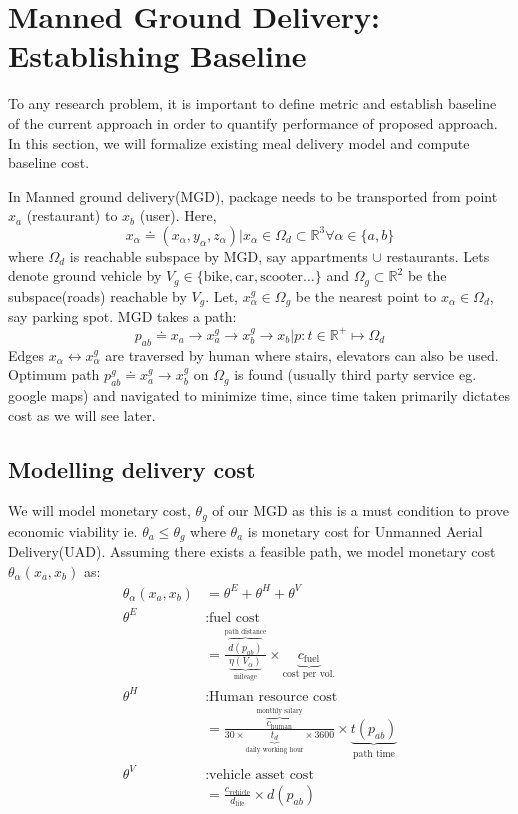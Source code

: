 \section{Manned Ground Delivery: Establishing Baseline}
\label{sec:mgd_model}
To any research problem, it is important to define metric and establish baseline of the current approach in order to quantify performance of proposed approach. In this section, we will formalize existing meal delivery model and compute baseline cost.

In Manned ground delivery(MGD), package needs to be transported from point $x_a$ (restaurant) to $x_b$ (user). Here, 
\begin{equation*}
    x_{\alpha} \doteq (x_\alpha, y_\alpha, z_\alpha) | x_\alpha \in \Omega_d \subset \mathbb{R}^3 \forall \alpha \in \{a,b\}
\end{equation*}
where $\Omega_d$ is reachable subspace by MGD, say appartments $\cup$ restaurants. Lets denote ground vehicle by $V_{g} \in \{\text{bike}, \text{car}, \text{scooter} \dots\}$ and $\Omega_g \subset \mathbb{R}^2$ be the subspace(roads) reachable by $V_{g}$. Let, $x_\alpha^g \in \Omega_g$ be the nearest point to $x_\alpha \in \Omega_d$, say parking spot. MGD takes a path:
\begin{equation*}
    p_{ab} \doteq x_a \longrightarrow x_a^g \longrightarrow x_b^g \longrightarrow x_b | p : t \in \mathbb{R}^+ \mapsto \Omega_d 
\end{equation*}
Edges $x_\alpha \longleftrightarrow x_\alpha^g$ are traversed by human where stairs, elevators can also be used. Optimum path $ p_{ab}^g \doteq x_a^g \longrightarrow x_b^g$ on $\Omega_g$ is found (usually third party service eg. google maps) and navigated to minimize time, since time taken primarily dictates cost as we will see later.

\subsection{Modelling delivery cost}
We will model monetary cost, $\theta_g$ of our MGD as this is a must condition to prove economic viability ie. $\theta_a \leqslant \theta_g$ where $\theta_a$ is monetary cost for  Unmanned Aerial Delivery(UAD).
Assuming there exists a feasible path, we model monetary cost $\theta_\alpha(x_a, x_b)$ as:
\begin{align*}
    \theta_\alpha(x_a, x_b) &= \theta^E + \theta^H + \theta^V \\
    \theta^E &: \text{fuel cost} \\
    &=  \frac{\overbrace{d(p_{ab})}^\text{path distance}}{\underbrace{\eta(V_\alpha)}_\text{mileage}}  \times \underbrace{c_\text{fuel}}_\text{cost per vol.} \\
    \theta^H &: \text{Human resource cost} \\
    &= \frac{\overbrace{c_\text{human}}^\text{monthly salary}}{30 \times \underbrace{t_d}_{\text{daily working hour}} \times 3600} \times \underbrace{t(p_{ab})}_\text{path time} \\
    \theta^V &: \text{vehicle asset cost} \\
    &= \frac{c_\text{vehicle}}{d_{\text{life}}} \times d(p_{ab})
\end{align*}

